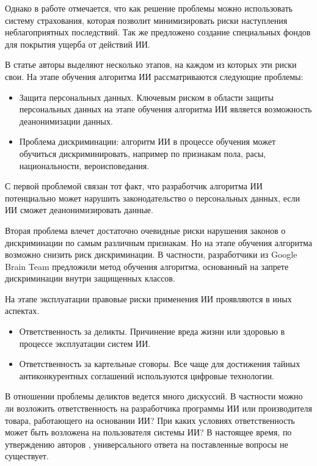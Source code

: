 Однако в работе \cite{reg} отмечается, что как решение проблемы можно использовать систему страхования,
которая позволит минимизировать риски наступления неблагоприятных последствий. Так же предложено
создание специальных фондов для покрытия ущерба от действий ИИ.

В статье \cite{self} авторы выделяют несколько этапов, на каждом из которых эти риски свои.
На этапе обучения алгоритма ИИ рассматриваются следующие проблемы:

\begin{itemize}
\item Защита персональных данных. Ключевым риском в области защиты персональных данных на этапе обучения
алгоритма ИИ является возможность деанонимизации данных.
\item Проблема дискриминации: алгоритм ИИ в процессе обучения может обучиться дискриминировать, например
по признакам пола, расы, национальности, вероисповедания.
\end{itemize}

С первой проблемой связан тот факт, что разработчик алгоритма ИИ потенциально может нарушить законодательство
о персональных данных, если ИИ сможет деанонимизировать данные.

Вторая проблема влечет достаточно очевидные риски нарушения законов о дискриминации по самым различным признакам.
Но на этапе обучения алгоритма возможно снизить риск
дискриминации. В частности, разработчики из Google Brain Team предложили метод обучения алгоритма,
основанный на запрете дискриминации внутри защищенных классов.

На этапе эксплуатации правовые риски применения ИИ проявляются в иных аспектах.

\begin{itemize}
\item Ответственность за деликты. Причинение вреда жизни или здоровью в процессе эксплуатации систем ИИ.
\item Ответственность за картельные сговоры. Все чаще для достижения тайных антиконкурентных соглашений
используются цифровые технологии.
\end{itemize}

В отношении проблемы деликтов ведется много дискуссий. В частности можно ли возложить ответственность на
разработчика программы ИИ или производителя товара, работающего на основании ИИ? При каких условиях
ответственность может быть возложена на пользователя системы ИИ? В настоящее время, по
утверждению авторов \cite{self}, универсального ответа на поставленные вопросы не существует.

